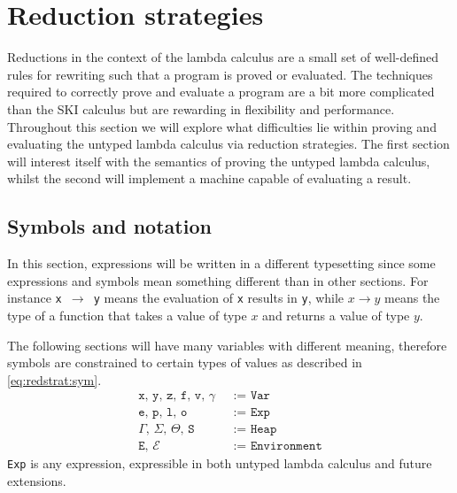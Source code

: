 \section{Reduction strategies}
Reductions in the context of the lambda calculus are a small set of well-defined rules for rewriting such that a program is proved or evaluated.
The techniques required to correctly prove and evaluate a program are a bit more complicated than the SKI calculus but are rewarding in flexibility and performance.
Throughout this section we will explore what difficulties lie within proving and evaluating the untyped lambda calculus via reduction strategies.
The first section will interest itself with the semantics of proving the untyped lambda calculus, whilst the second will implement a machine capable of evaluating a result.

\subsection{Symbols and notation}
In this section, expressions will be written in a different typesetting since some expressions and symbols mean something different than in other sections.
For instance \texttt{x $\rightarrow$ y} means the evaluation of \texttt{x} results in \texttt{y}, while $x \rightarrow y$ means the type of a function that takes a value of type $x$ and returns a value of type $y$.

The following sections will have many variables with different meaning, therefore symbols are constrained to certain types of values as described in \autoref{eq:redstrat:sym}.
\begin{align}
	\texttt{x, y, z, f, v, $\gamma$ }         & \texttt{:= Var}\label{eq:redstrat:sym} \\
	\texttt{e, p, l, o }                      & \texttt{:= Exp}\tag*{}                 \\
	\texttt{$\Gamma$, $\Sigma$, $\Theta$, S } & \texttt{:= Heap}\tag*{}                \\
	\texttt{E, $\mathcal{E}$ }                & \texttt{:= Environment}\tag*{}
\end{align}
\texttt{Exp} is any expression, expressible in both untyped lambda calculus and future extensions.


